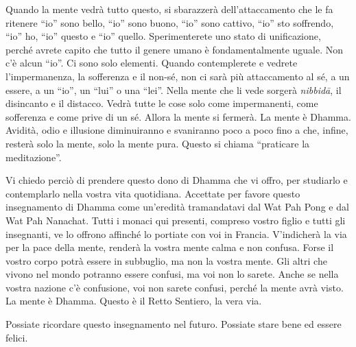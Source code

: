 Quando la mente vedrà tutto questo, si sbarazzerà dell'attaccamento che
le fa ritenere ``io'' sono bello, ``io'' sono buono, ``io'' sono
cattivo, ``io'' sto soffrendo, ``io'' ho, ``io'' questo e ``io'' quello.
Sperimenterete uno stato di unificazione, perché avrete capito che
tutto il genere umano è fondamentalmente uguale. Non c'è alcun ``io''.
Ci sono solo elementi. Quando contemplerete e vedrete l'impermanenza, la
sofferenza e il non-sé, non ci sarà più attaccamento al sé, a un essere,
a un ``io'', un ``lui'' o una ``lei''. Nella mente che li vede sorgerà
\emph{nibbidā}, il disincanto e il distacco. Vedrà tutte le cose solo
come impermanenti, come sofferenza e come prive di un sé. Allora la
mente si fermerà. La mente è Dhamma. Avidità, odio e illusione
diminuiranno e svaniranno poco a poco fino a che, infine, resterà solo
la mente, solo la mente pura. Questo si chiama ``praticare la
meditazione''.

Vi chiedo perciò di prendere questo dono di Dhamma che vi offro, per
studiarlo e contemplarlo nella vostra vita quotidiana. Accettate per
favore questo insegnamento di Dhamma come un'eredità tramandatavi dal
Wat Pah Pong e dal Wat Pah Nanachat. Tutti i monaci qui presenti,
compreso vostro figlio e tutti gli insegnanti, ve lo offrono affinché lo
portiate con voi in Francia. V'indicherà la via per la pace della mente,
renderà la vostra mente calma e non confusa. Forse il vostro corpo potrà
essere in subbuglio, ma non la vostra mente. Gli altri che vivono nel
mondo potranno essere confusi, ma voi non lo sarete. Anche se nella
vostra nazione c'è confusione, voi non sarete confusi, perché la mente
avrà visto. La mente è Dhamma. Questo è il Retto Sentiero, la vera via.

Possiate ricordare questo insegnamento nel futuro. Possiate stare bene
ed essere felici.


